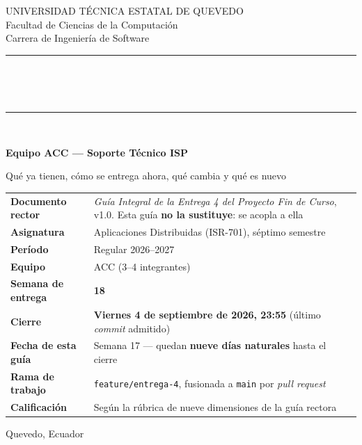 \documentclass[11pt,a4paper]{article}
\begin{document}
\begin{titlepage}
	\centering
	\vspace*{0.8cm}
	{\small\color{uteqGray} UNIVERSIDAD TÉCNICA ESTATAL DE QUEVEDO\\ Facultad de Ciencias de la Computación\\ Carrera de Ingeniería de Software\par}
	\vspace{14pt}
	{\color{uteqBlue}\rule{\textwidth}{2pt}}\\[7pt]
	\colorbox{uteqBlue}{\parbox{0.96\textwidth}{\centering{}\vspace{5pt}}}\\[7pt]
	{\color{uteqBlue}\rule{\textwidth}{2pt}}\\[16pt]
	{\LARGE\bfseries\color{uteqBlue} Equipo ACC --- Soporte Técnico ISP\par}
	\vspace{5pt}
	{\large\color{uteqGray} Qué ya tienen, cómo se entrega ahora, qué cambia y qué es nuevo\par}
	\vspace{20pt}
	\begin{minipage}{0.93\textwidth}
		\small
		\begin{tabular}{@{}p{4.6cm}p{9.8cm}@{}}
			\toprule
			\textbf{Documento rector} & \emph{Guía Integral de la Entrega 4 del Proyecto Fin de Curso}, v1.0. Esta guía \textbf{no la sustituye}: se acopla a ella \\
			\textbf{Asignatura} & Aplicaciones Distribuidas (ISR-701), séptimo semestre \\
			\textbf{Período} & Regular 2026--2027 \\
			\textbf{Equipo} & ACC (3--4 integrantes) \\
			\textbf{Semana de entrega} & \textbf{18} \\
			\textbf{Cierre} & \textbf{Viernes 4 de septiembre de 2026, 23:55} (último \emph{commit} admitido) \\
			\textbf{Fecha de esta guía} & Semana 17 --- quedan \textbf{nueve días naturales} hasta el cierre \\
			\textbf{Rama de trabajo} & \texttt{feature/entrega-4}, fusionada a \texttt{main} por \emph{pull request} \\
			\textbf{Calificación} & Según la rúbrica de nueve dimensiones de la guía rectora \\
			\bottomrule
		\end{tabular}
	\end{minipage}
	\vfill
	{\small\color{uteqGray} Quevedo, Ecuador\par}
\end{titlepage}
\end{document}
